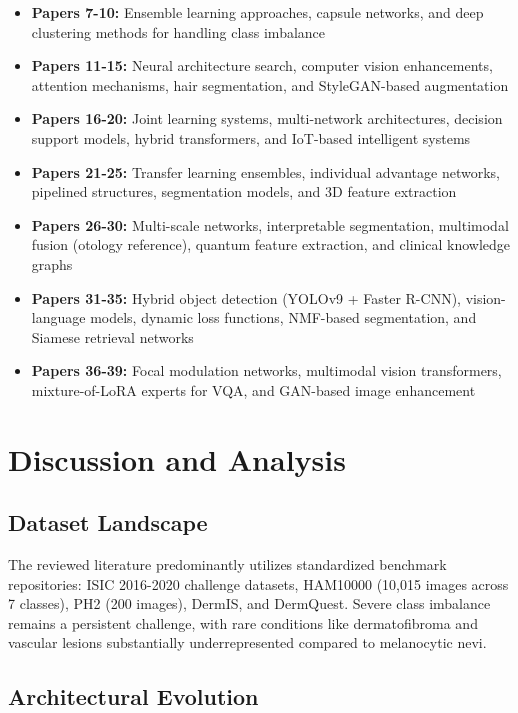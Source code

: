 \documentclass[conference]{IEEEtran}
\begin{document}
\begin{itemize}
\item \textbf{Papers 7-10:} Ensemble learning approaches, capsule networks, and deep clustering methods for handling class imbalance
\item \textbf{Papers 11-15:} Neural architecture search, computer vision enhancements, attention mechanisms, hair segmentation, and StyleGAN-based augmentation
\item \textbf{Papers 16-20:} Joint learning systems, multi-network architectures, decision support models, hybrid transformers, and IoT-based intelligent systems
\item \textbf{Papers 21-25:} Transfer learning ensembles, individual advantage networks, pipelined structures, segmentation models, and 3D feature extraction
\item \textbf{Papers 26-30:} Multi-scale networks, interpretable segmentation, multimodal fusion (otology reference), quantum feature extraction, and clinical knowledge graphs
\item \textbf{Papers 31-35:} Hybrid object detection (YOLOv9 + Faster R-CNN), vision-language models, dynamic loss functions, NMF-based segmentation, and Siamese retrieval networks
\item \textbf{Papers 36-39:} Focal modulation networks, multimodal vision transformers, mixture-of-LoRA experts for VQA, and GAN-based image enhancement
\end{itemize}

\section{Discussion and Analysis}

\subsection{Dataset Landscape}

The reviewed literature predominantly utilizes standardized benchmark repositories: ISIC 2016-2020 challenge datasets, HAM10000 (10,015 images across 7 classes), PH2 (200 images), DermIS, and DermQuest. Severe class imbalance remains a persistent challenge, with rare conditions like dermatofibroma and vascular lesions substantially underrepresented compared to melanocytic nevi.

\subsection{Architectural Evolution}
\end{document}
